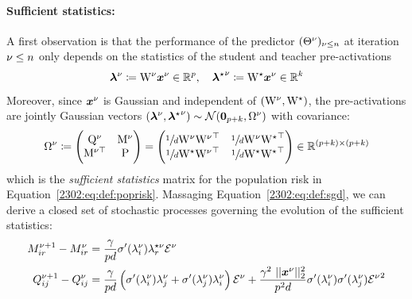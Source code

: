 \paragraph{Sufficient statistics:} A first observation is that the performance of the predictor $(\Theta^{\nu})_{\nu\leq n}$ at iteration $\nu \leq n$ only depends on the statistics of the student and teacher pre-activations 
\begin{equation}\label{2302:eq:def:pre_activations}
    {\boldsymbol{\lambda}}^{\nu}\coloneqq \mathrm{W}^{\nu}{\boldsymbol{x}}^{\nu}\in\mathbb{R}^{p}, \quad {{\boldsymbol{\lambda}}^{\star}}^{\nu}\coloneqq\mathrm{W}^{\star}{\boldsymbol{x}}^{\nu}\in\mathbb{R}^{k}
\end{equation}
Moreover, since ${\boldsymbol{x}}^\nu$ is Gaussian and independent of $(\mathrm{W}^{\nu}, \mathrm{W}^{\star})$, the pre-activations are jointly Gaussian vectors $({\boldsymbol{\lambda}}^{\nu}, {{\boldsymbol{\lambda}}^{\star}}^{\nu})\sim\mathcal{N}({\boldsymbol{0}}_{p+k}, \Omega^{\nu})$ with covariance: 
\begin{equation}\label{2302:eq:def:overlaps}
\begin{split}
\Omega^{\nu}\coloneqq
\begin{pmatrix}
\mathrm{Q}^{\nu}& \mathrm{M}^{\nu}\\
{\mathrm{M}^{\nu\top}} & \mathrm{P}
\end{pmatrix}=
\begin{pmatrix}
\sfrac{1}{d}\mathrm{W}^{\nu}{\mathrm{W}^{\nu}}^{\top}& \sfrac{1}{d}\mathrm{W}^{\nu}{\mathrm{W}^{\star}}^{\top}\\
\sfrac{1}{d}\mathrm{W}^{\star}{\mathrm{W}^{\nu}}^{\top}& \sfrac{1}{d}\mathrm{W}^{\star}{\mathrm{W}^{\star}}^{\top}
\end{pmatrix}
\in\mathbb{R}^{(p+k)\times (p+k)}
\end{split}
\end{equation}
which is the \emph{sufficient statistics} matrix for the population risk in Equation~\eqref{2302:eq:def:poprisk}. Massaging Equation~\eqref{2302:eq:def:sgd}, we can derive a closed set of stochastic processes governing the evolution of the sufficient statistics:
\begin{equation}
\label{2302:eq:def:overlap_process}
\begin{split}
M^{\nu+1}_{ir} - M^{\nu}_{ir} &= \frac{\gamma}{p d}\sigma'(\lambda_i^\nu)\lambda^{\star\nu}_{r}  \mathcal{E}^{\nu}\\
Q_{ij}^{\nu+1} - Q^{\nu}_{ij} &=  \frac{\gamma}{p d}\left(\sigma'(\lambda_i^\nu)\lambda^{\nu}_{j}+\sigma'(\lambda_j^\nu)\lambda^{\nu}_{i}\right) \mathcal{E}^\nu+\frac{\gamma^2 ~||{\boldsymbol{x}}^{\nu}||_{2}^{2}}{p^2d}	\sigma'(\lambda_i^\nu)\sigma'(\lambda_j^\nu) {\mathcal{E}^{\nu}}^2
\end{split}
\end{equation}
